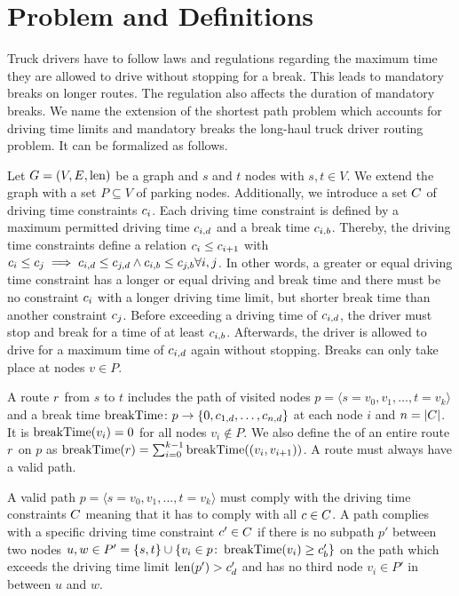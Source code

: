 \chapter{Problem and Definitions}\label{chapter:problem_definitions}
Truck drivers have to follow laws and regulations regarding the maximum time they are allowed to drive without stopping for a break. This leads to mandatory breaks on longer routes. The regulation also affects the duration of mandatory breaks. We name the extension of the shortest path problem which accounts for driving time limits and mandatory breaks the long-haul truck driver routing problem. It can be formalized as follows.

Let $G=(V,E,\operatorname{len})$ be a graph and $s$ and $t$ nodes with $s,t \in V$. We extend the graph with a set $P \subseteq V$ of parking nodes. Additionally, we introduce a set $C$ of driving time constraints $c_i$. Each driving time constraint is defined by a maximum permitted driving time $c_{i,d}$ and a break time $c_{i,b}$. Thereby, the driving time constraints define a relation $c_i \le c_{i+1}$ with $c_i \le c_j \implies c_{i,d} \le c_{j,d} \land  c_{i,b} \le c_{j,b} \forall i,j$. In other words, a greater or equal driving time constraint has a longer or equal driving and break time and there must be no constraint $c_i$ with a longer driving time limit, but shorter break time than another constraint $c_j$. Before exceeding a driving time of $c_{i,d}$, the driver must stop and break for a time of at least $c_{i,b}$. Afterwards, the driver is allowed to drive for a maximum time of $c_{i,d}$ again without stopping. Breaks can only take place at nodes $v \in P$.

A route $r$ from $s$ to $t$ includes the path of visited nodes $p = \langle s=v_0,v_1,\dots,t=v_k \rangle$ and a break time $\operatorname{breakTime}\colon p \rightarrow \{0,c_{1,d},\dots,c_{n,d}\}$ at each node $i$ and $n = |C|$. It is $\operatorname{breakTime}(v_i) = 0$ for all nodes $v_i \notin P$. We also define the \breakTime of an entire route $r$ on $p$ as $\operatorname{breakTime}(r) = \sum_{i=0}^{k-1}{\operatorname{breakTime}((v_i,v_{i+1}))}$. A route must always have a valid path.

\begin{definition}
	A valid path $p = \langle s=v_0,v_1,...,t=v_k \rangle$ must comply with the driving time constraints $C$ meaning that it has to comply with all $c \in C$. A path complies with a specific driving time constraint $c' \in C$ if there is no subpath $p'$ between two nodes $u,w \in P' = \{s,t\} \cup \{v_i \in p \colon \operatorname{breakTime}(v_i) \ge c'_{b}\}$ on the path which exceeds the driving time limit $\operatorname{len}(p') > c'_{d}$ and has no third node $v_i \in P'$ in between $u$ and $w$.
\end{definition}


